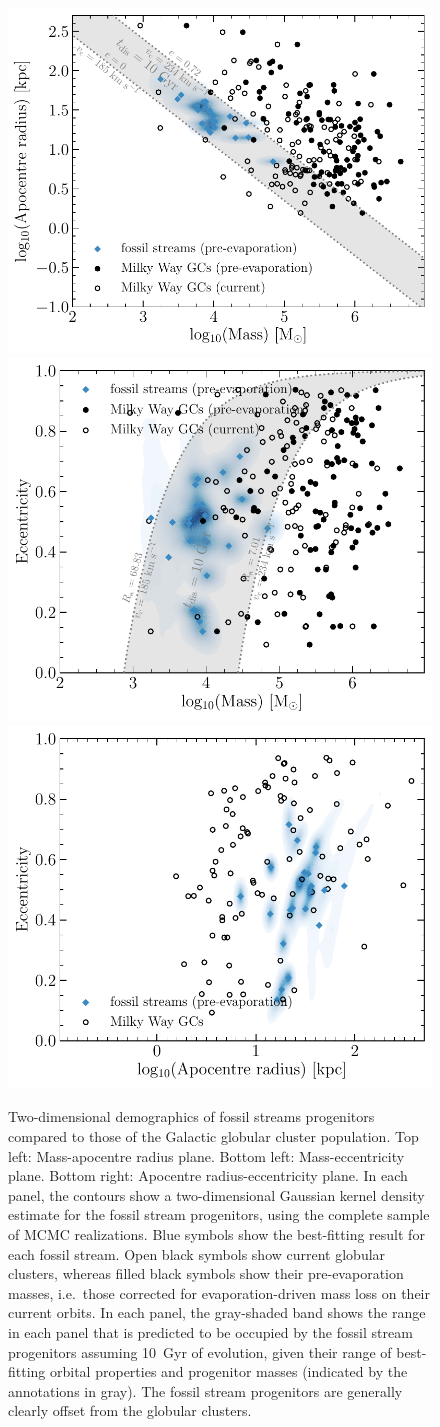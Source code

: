 \documentclass[twocolumn]{aastex63}
\begin{document}
\begin{figure}
\includegraphics[width=0.5\hsize]{figures/mass_rapo.pdf}\\
\includegraphics[width=0.5\hsize]{figures/mass_ecc.pdf}%
\includegraphics[width=0.5\hsize]{figures/rapo_ecc.pdf}%
\caption{
\label{fig:kde}
Two-dimensional demographics of fossil streams progenitors compared to those of the Galactic globular cluster population. Top left: Mass-apocentre radius plane. Bottom left: Mass-eccentricity plane. Bottom right: Apocentre radius-eccentricity plane. In each panel, the contours show a two-dimensional Gaussian kernel density estimate for the fossil stream progenitors, using the complete sample of MCMC realizations. Blue symbols show the best-fitting result for each fossil stream. Open black symbols show current globular clusters, whereas filled black symbols show their pre-evaporation masses, i.e.\ those corrected for evaporation-driven mass loss on their current orbits. In each panel, the gray-shaded band shows the range in each panel that is predicted to be occupied by the fossil stream progenitors assuming 10~Gyr of evolution, given their range of best-fitting orbital properties and progenitor masses (indicated by the annotations in gray). The fossil stream progenitors are generally clearly offset from the globular clusters.}
\end{figure}
\end{document}

